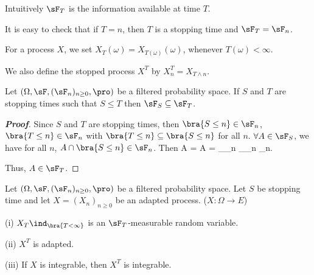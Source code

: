 \begin{remark}
Intuitively $\sF_T$ is the information available at time $T$.

It is easy to check that if $T = n$, then $T$ is a stopping time and $\sF_T = \sF_n$.
\end{remark}

\begin{definition}\label{def:stopped_process_discrete}
For a process $X$, we set $X_T (\omega) = X_{T(\omega)}(\omega)$, whenever $T(\omega) < \infty$.

We also define the stopped process $X^T$ by $X^T_n = X_{T\land n}$.
\end{definition}


\begin{proposition}\label{pro:sigma_algebra_stopping_time_increasing}
Let $(\Omega,\sF, (\sF_n)_{n\geq 0},\pro)$ be a filtered probability space. If $S$ and $T$ are stopping times such that $S \leq T$ then $\sF_S \subseteq \sF_T$.
\end{proposition}

\begin{proof}[\bf Proof]
Since $S$ and $T$ are stopping times, then $\bra{S \leq n}\in \sF_n$, $\bra{T \leq n}\in \sF_n$ with $\bra{T\leq n} \subseteq \bra{S\leq n}$ for all $n$. $\forall A \in \sF_S$, we have for all $n$, $A \cap \bra{S \leq n} \in \sF_n$. Then
\be
A \cap {} = A \cap {} = _{\in \sF_n} \cap {}_{\in \sF_n} \in \sF_n.
\ee

Thus, $A\in \sF_T$.
\end{proof}


\begin{proposition}
Let $(\Omega,\sF, (\sF_n)_{n\geq 0},\pro)$ be a filtered probability space. Let $S$ be stopping time and let $X = (X_n)_{n\geq 0}$ be an adapted process. ($X: \Omega \to E$)
\ben
\item [(i)] $X_T\ind_{\bra{T <\infty}}$ is an $\sF_T$-measurable random variable.
\item [(ii)] $X^T$ is adapted.
\item [(iii)] If $X$ is integrable, then $X^T$ is integrable.
\een
\end{proposition}


